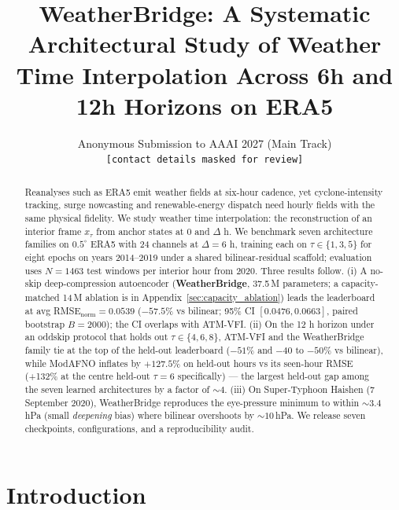 \documentclass[10pt,letterpaper,twocolumn]{article}
\title{WeatherBridge: A Systematic Architectural Study of Weather \\
  Time Interpolation Across 6h and 12h Horizons on ERA5}
\author{Anonymous Submission to AAAI 2027 (Main Track) \\
    \texttt{[contact details masked for review]}}
\date{}
\begin{document}
\maketitle

\begin{abstract}
Reanalyses such as ERA5 emit weather fields at six-hour cadence, yet
cyclone-intensity tracking, surge nowcasting and renewable-energy
dispatch need hourly fields with the same physical fidelity. We study
weather time interpolation: the reconstruction of an interior frame
$x_\tau$ from anchor states at $0$ and $\Delta$ h. We benchmark seven
architecture families on $0.5^\circ$ ERA5
\cite{hersbach2020era5,rasp2024weatherbench} with 24 channels at
$\Delta{=}6$ h, training each on $\tau \in \{1, 3, 5\}$ for eight epochs
on years 2014--2019 under a shared bilinear-residual scaffold;
evaluation uses $N{=}1463$ test windows per interior hour from 2020.
Three results follow. (i) A no-skip deep-compression autoencoder
(\textbf{WeatherBridge}, 37.5\,M parameters; a capacity-matched 14\,M
ablation is in Appendix~\ref{sec:capacity_ablation}) leads the leaderboard at avg
RMSE$_{\text{norm}}{=}0.0539$ ($-57.5\%$ vs bilinear; 95\% CI
$[0.0476, 0.0663]$, paired bootstrap $B{=}2000$); the CI overlaps with
ATM-VFI. (ii) On the 12 h horizon under an
oddskip protocol that holds out $\tau \in \{4, 6, 8\}$, ATM-VFI and
the WeatherBridge family tie at the top of the held-out leaderboard
($-51\%$ and $-40$ to $-50\%$ vs bilinear), while ModAFNO inflates by
$+127.5\%$ on held-out hours vs its seen-hour RMSE (+132\% at the centre
held-out $\tau{=}6$ specifically) — the largest held-out gap among the
seven learned architectures by a factor of $\sim 4$.
(iii) On Super-Typhoon Haishen (7 September 2020), WeatherBridge
reproduces the eye-pressure minimum to within $\sim 3.4$\,hPa
(small \emph{deepening} bias) where bilinear overshoots by $\sim 10$\,hPa. We release seven checkpoints, configurations, and
a reproducibility audit.
\end{abstract}

\section{Introduction}
\end{document}
